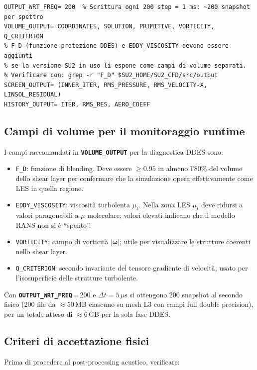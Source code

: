 \documentclass[11pt,a4paper]{article}
\newcommand{\kw}[1]{\texttt{\color{keywordcolor}\bfseries #1}}
\newcommand{\mus}{\ensuremath{\,\mu\mathrm{s}}}
\begin{document}
\begin{lstlisting}[style=SU2cfg, caption={File di configurazione SU2 v8 per DDES SA — Fase 4 della pipeline. Commenti riga per riga.}, label=lst:ddes_cfg]
% --- Output ---
OUTPUT_WRT_FREQ= 200  % Scrittura ogni 200 step = 1 ms: ~200 snapshot per spettro
VOLUME_OUTPUT= COORDINATES, SOLUTION, PRIMITIVE, VORTICITY, Q_CRITERION
% F_D (funzione protezione DDES) e EDDY_VISCOSITY devono essere aggiunti
% se la versione SU2 in uso li espone come campi di volume separati.
% Verificare con: grep -r "F_D" $SU2_HOME/SU2_CFD/src/output
SCREEN_OUTPUT= (INNER_ITER, RMS_PRESSURE, RMS_VELOCITY-X, LINSOL_RESIDUAL)
HISTORY_OUTPUT= ITER, RMS_RES, AERO_COEFF
\end{lstlisting}

\subsection{Campi di volume per il monitoraggio runtime}

I campi raccomandati in \kw{VOLUME\_OUTPUT} per la diagnostica DDES sono:

\begin{itemize}
  \item \texttt{F\_D}: funzione di blending. Deve essere $\geq 0.95$ in almeno
        l'80\% del volume dello shear layer per confermare che la simulazione
        opera effettivamente come LES in quella regione.
  \item \texttt{EDDY\_VISCOSITY}: viscosità turbolenta $\mu_t$. Nella zona LES
        $\mu_t$ deve ridursi a valori paragonabili a $\mu$ molecolare; valori
        elevati indicano che il modello RANS non si è ``spento''.
  \item \texttt{VORTICITY}: campo di vorticità $|\boldsymbol{\omega}|$;
        utile per visualizzare le strutture coerenti nello shear layer.
  \item \texttt{Q\_CRITERION}: secondo invariante del tensore gradiente di
        velocità, usato per l'isosuperficie delle strutture turbolente.
\end{itemize}

Con \kw{OUTPUT\_WRT\_FREQ}\,=\,200 e $\Delta t = 5\mus$ si ottengono 200
snapshot al secondo fisico (200 file da $\approx$50\,MB ciascuno su mesh L3
con campi full double precision), per un totale atteso di $\approx$6\,GB
per la sola fase DDES.

\subsection{Criteri di accettazione fisici}

Prima di procedere al post-processing acustico, verificare:
\end{document}
